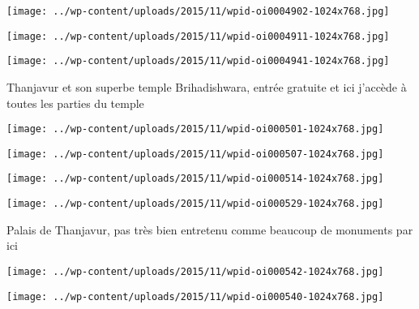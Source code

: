  

 

\begin{center} \texttt{[image: ../wp-content/uploads/2015/11/wpid-oi0004902-1024x768.jpg]} \end{center}

 

 

\begin{center} \texttt{[image: ../wp-content/uploads/2015/11/wpid-oi0004911-1024x768.jpg]} \end{center}

 

 

\begin{center} \texttt{[image: ../wp-content/uploads/2015/11/wpid-oi0004941-1024x768.jpg]} \end{center}

 

 Thanjavur et son superbe temple Brihadishwara, entrée gratuite et ici j'accède à toutes les parties du temple 

 

\begin{center} \texttt{[image: ../wp-content/uploads/2015/11/wpid-oi000501-1024x768.jpg]} \end{center}

 

 

\begin{center} \texttt{[image: ../wp-content/uploads/2015/11/wpid-oi000507-1024x768.jpg]} \end{center}

 

 

\begin{center} \texttt{[image: ../wp-content/uploads/2015/11/wpid-oi000514-1024x768.jpg]} \end{center}

 

 

\begin{center} \texttt{[image: ../wp-content/uploads/2015/11/wpid-oi000529-1024x768.jpg]} \end{center}

 

 Palais de Thanjavur, pas très bien entretenu comme beaucoup de monuments par ici 

 

\begin{center} \texttt{[image: ../wp-content/uploads/2015/11/wpid-oi000542-1024x768.jpg]} \end{center}

 

 

\begin{center} \texttt{[image: ../wp-content/uploads/2015/11/wpid-oi000540-1024x768.jpg]} \end{center}




 
 

